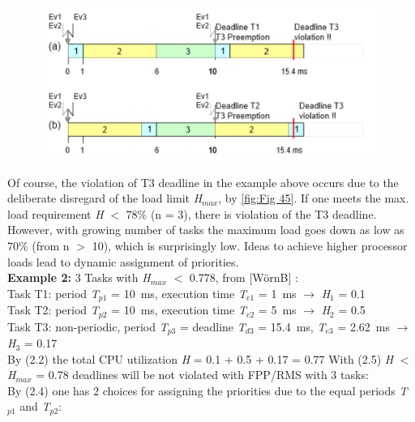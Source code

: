  	\begin{figure}[h]
    \centering
    \includegraphics[width=12cm, height=5cm]{Images/image100.png}
    \label{fig:Fig 45}
    \end{figure}

{\nsl{\newpage}}
Of course, the violation of T3 deadline in the example above occurs due to the deliberate disregard of the load limit \textit{H${}_{max}$}, by \eqref{fig:Fig 45}. If one meets the max. load requirement \textit{H} $\mathrm{<}$ 78\% (n = 3), there is violation of the T3 deadline.\\

However, with growing number of tasks the maximum load goes down as low as 70\% (from n $\mathrm{>}$ 10), which is surprisingly low. Ideas to achieve higher processor loads lead to dynamic assignment of priorities.\\

\textbf{Example 2:} 3 Tasks with \textit{H}${}_{max}$ $\mathrm{<}$ 0.778, from [W\"{o}rnB] :\\
Task T1: period \textit{T}${}_{p1}$ = 10~ms, execution time \textit{T}${}_{e1}$ = 1~ms  $\rightarrow$ \textit{H}${}_{1}$ = 0.1\\
Task T2: period \textit{T}${}_{p2}$ = 10~ms, execution time\textit{ T}${}_{e2}$ = 5~ms  $\rightarrow$ \textit{H}${}_{2}$ = 0.5\\
Task T3: non-periodic, period \textit{T}${}_{p3}$ = deadline \textit{T}${}_{d3}$ = 15.4~ms, \textit{T}${}_{e3}$ = 2.62~ms  $\rightarrow$ \textit{H}${}_{3}$ = 0.17\\

By (2.2) the total CPU utilization \textit{H} = 0.1 + 0.5 + 0.17 = 0.77 With (2.5) \textit{H} $\mathrm{<}$ \textit{H}${}_{max}$ = 0.78 deadlines will be not violated with FPP/RMS with 3 tasks:\\

By (2.4) one has 2 choices for assigning the priorities due to the equal periods \textit{T}${}_{p1}$\textit{ }and \textit{T}${}_{p2}$:

